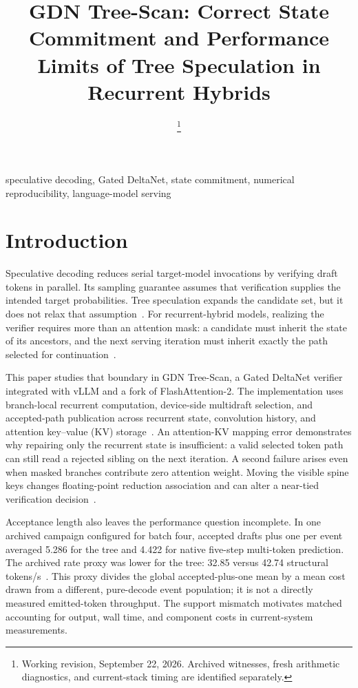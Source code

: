 \documentclass[conference]{IEEEtran}
\newcommand{\sys}{GDN Tree-Scan}
\begin{document}
\title{GDN Tree-Scan: Correct State Commitment and Performance Limits of Tree Speculation in Recurrent Hybrids}
\author{
\thanks{Working revision, September 22, 2026. Archived witnesses, fresh arithmetic diagnostics, and current-stack timing are identified separately.}}
\maketitle

\begin{IEEEkeywords}
speculative decoding, Gated DeltaNet, state commitment, numerical reproducibility, language-model serving
\end{IEEEkeywords}

\section{Introduction}
Speculative decoding reduces serial target-model invocations by verifying draft tokens in parallel. Its sampling guarantee assumes that verification supplies the intended target probabilities. Tree speculation expands the candidate set, but it does not relax that assumption~\cite{leviathan2023fast,chen2023sampling,miao2023specinfer}. For recurrent-hybrid models, realizing the verifier requires more than an attention mask: a candidate must inherit the state of its ancestors, and the next serving iteration must inherit exactly the path selected for continuation~\cite{yang2024gated,wu2025stree}.

This paper studies that boundary in \sys{}, a Gated DeltaNet verifier integrated with vLLM and a fork of FlashAttention-2. The implementation uses branch-local recurrent computation, device-side multidraft selection, and accepted-path publication across recurrent state, convolution history, and attention key--value (KV) storage~\cite{lumo2026receipts,lumo2026stateless}. An attention-KV mapping error demonstrates why repairing only the recurrent state is insufficient: a valid selected token path can still read a rejected sibling on the next iteration. A second failure arises even when masked branches contribute zero attention weight. Moving the visible spine keys changes floating-point reduction association and can alter a near-tied verification decision~\cite{lumo2026spine}.

Acceptance length also leaves the performance question incomplete. In one archived campaign configured for batch four, accepted drafts plus one per event averaged 5.286 for the tree and 4.422 for native five-step multi-token prediction. The archived rate proxy was lower for the tree: 32.85 versus 42.74 structural tokens/s~\cite{lumo2026cost,lumo2026archive}. This proxy divides the global accepted-plus-one mean by a mean cost drawn from a different, pure-decode event population; it is not a directly measured emitted-token throughput. The support mismatch motivates matched accounting for output, wall time, and component costs in current-system measurements.
\end{document}
